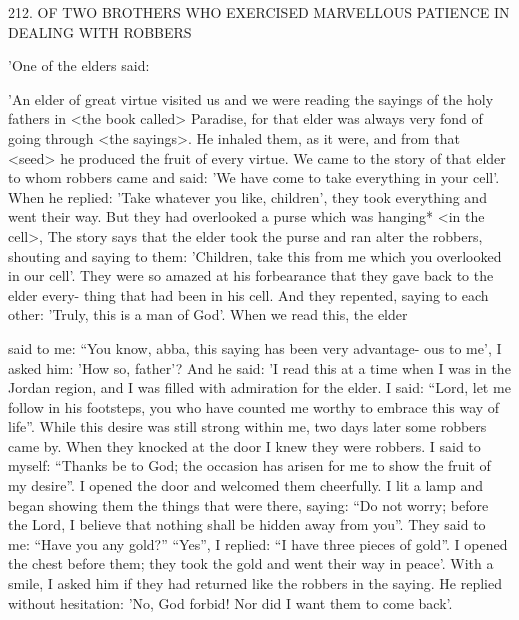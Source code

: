 212.
OF TWO BROTHERS WHO EXERCISED
MARVELLOUS PATIENCE IN DEALING WITH ROBBERS

'One of the elders said:

'An elder of great virtue visited us and we were reading the sayings
of the holy fathers in <the book called> Paradise, for that elder was
always very fond of going through <the sayings>.
He inhaled them,
as it were, and from that <seed> he produced the fruit of every
virtue.
We came to the story of that elder to whom robbers came
and said: 'We have come to take everything in your cell'.
When he
replied: 'Take whatever you like, children', they took everything and
went their way.
But they had overlooked a purse which was
hanging* <in the cell>, The story says that the elder took the purse
and ran alter the robbers, shouting and saying to them: 'Children,
take this from me which you overlooked in our cell'.
They were so
amazed at his forbearance that they gave back to the elder every-
thing that had been in his cell.
And they repented, saying to each
other: 'Truly, this is a man of God'.
When we read this, the elder

said to me: “You know, abba, this saying has been very advantage-
ous to me', I asked him: 'How so, father'? And he said: 'I read this
at a time when I was in the Jordan region, and I was filled with
admiration for the elder.
I said: “Lord, let me follow in his
footsteps, you who have counted me worthy to embrace this way of
life”.
While this desire was still strong within me, two days later
some robbers came by.
When they knocked at the door I knew they
were robbers.
I said to myself: “Thanks be to God; the occasion has
arisen for me to show the fruit of my desire”.
I opened the door and
welcomed them cheerfully.
I lit a lamp and began showing them the
things that were there, saying: “Do not worry; before the Lord, I
believe that nothing shall be hidden away from you”.
They said to
me: “Have you any gold?” “Yes”, I replied: “I have three pieces of
gold”.
I opened the chest before them; they took the gold and went
their way in peace'.
With a smile, I asked him if they had returned
like the robbers in the saying.
He replied without hesitation: 'No,
God forbid! Nor did I want them to come back'.

